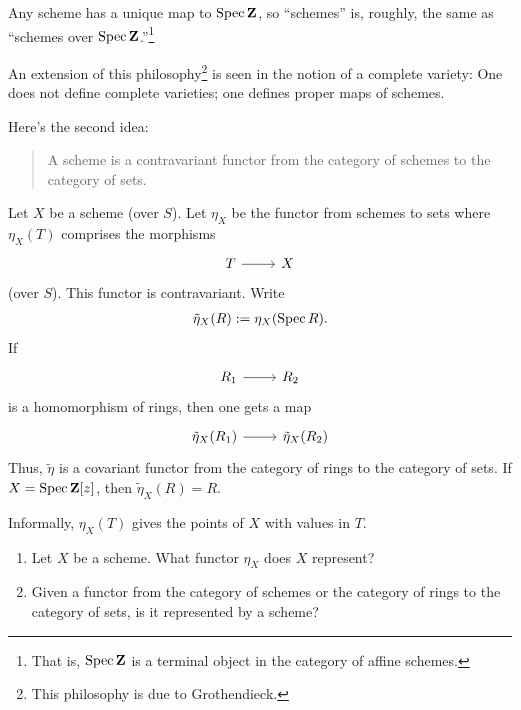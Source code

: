 \documentclass [11 pt, oneside] {article}
\begin{document}
\begin{remark}
	Any scheme has a unique map to $\operatorname{Spec} \mathbf{Z}$, so ``schemes'' is, roughly, the same as ``schemes over $\operatorname{Spec} \mathbf{Z}$.''\footnote{That is, $\operatorname{Spec} \mathbf{Z}$ is a terminal object in the category of affine schemes.}
\end{remark}

An extension of this philosophy\footnote{This philosophy is due to Grothendieck.} is seen in the notion of a complete variety: One does not define complete varieties; one defines proper maps of schemes.

Here's the second idea: 
\begin{quote}
	\small 
	A scheme is a contravariant functor from the category of schemes to the category of sets.
\end{quote}
Let $X$ be a scheme (over $S$). Let $\eta_X$ be the functor from schemes to sets where $\eta_X(T)$ comprises the morphisms 
\[
\begin{tikzcd}
T\ar[r]&X
\end{tikzcd}
\]  
(over $S$). This functor is contravariant. Write
\begin{align*}
	\tilde \eta_X(R) := \eta_X (\operatorname{Spec} R).
\end{align*}
If 
\[
\begin{tikzcd}
R_1\ar[r]& R_2
\end{tikzcd}
\] 
is a homomorphism of rings, then one gets a map 
\[
\begin{tikzcd}
\tilde \eta_X(R_1)\ar[r]& \tilde \eta_X(R_2)
\end{tikzcd}
\] 
Thus, $\tilde\eta$ is a covariant functor from the category of rings to the category of sets. If $X=\operatorname{Spec} \mathbf{Z}[z]$, then $\tilde \eta_X(R)=R$.

\begin{remark}
	Informally, $\eta_X(T)$ gives the points of $X$ with values in $T$.
\end{remark}

\begin{problem}\text{}
	\begin{enumerate}
		\item Let $X$ be a scheme. What functor $\eta_X$ does $X$ represent?
		\item Given a functor from the category of schemes or the category of rings to the category of sets, is it represented by a scheme?
	\end{enumerate}
\end{problem}
\end{document}
